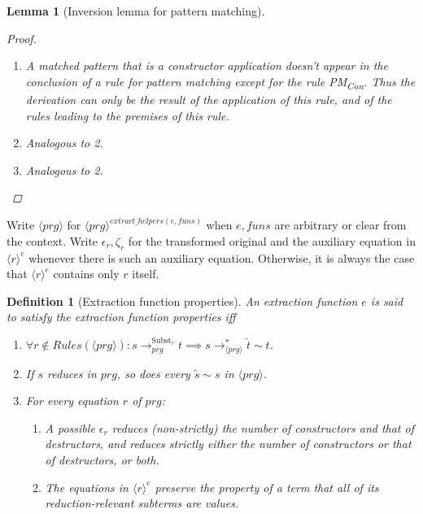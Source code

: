\documentclass[11pt]{article} %
\newtheorem{lemma}{Lemma}
\newtheorem*{definition*}{Definition}
\begin{document}
\begin{lemma}[Inversion lemma for pattern matching]
\begin{proof}
\begin{enumerate}
\item A matched pattern that is a constructor application doesn't appear in the conclusion of a rule for pattern matching except for the rule PM\textsubscript{Con}. Thus the derivation can only be the result of the application of this rule, and of the rules leading to the premises of this rule.

\item Analogous to 2.

\item Analogous to 2.

\end{enumerate}

\end{proof}

\end{lemma}

Write $\langle prg \rangle$ for $\langle prg \rangle^{extract\_helpers(e, funs)}$ when $e, funs$ are arbitrary or clear from the context. Write $\epsilon_r, \zeta_r$ for the transformed original and the auxiliary equation in $\langle r \rangle^e$ whenever there is such an auxiliary equation. Otherwise, it is always the case that $\langle r \rangle^e$ contains only $r$ itself.

\begin{definition*}[Extraction function properties]
An extraction function $e$ is said to satisfy the extraction function properties iff

\begin{enumerate}
\item $\forall r \not\in Rules(\langle prg \rangle): s \longrightarrow^{\textrm{Subst}_r}_{prg} t \implies s \longrightarrow^*_{\langle prg \rangle} \widetilde{t} \sim t$.

\item If $s$ reduces in $prg$, so does every $\widetilde{s} \sim s$ in $\langle prg \rangle$.

\item For every equation $r$ of $prg$:
\begin{enumerate}
\item A possible $\epsilon_r$ reduces (non-strictly) the number of constructors and that of destructors, and reduces strictly either the number of constructors or that of destructors, or both.

\item The equations in $\langle r \rangle^e$ preserve the property of a term that all of its reduction-relevant subterms are values.
\end{enumerate}

\end{enumerate}

\end{definition*}
\end{document}

